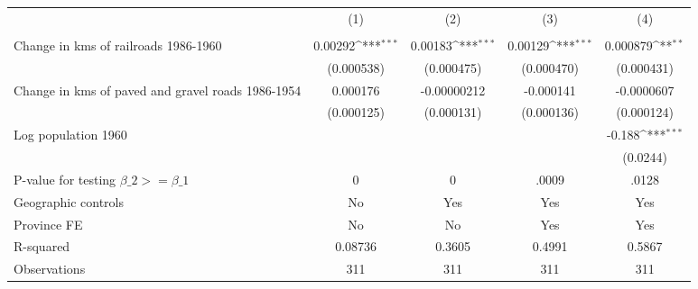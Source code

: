 {
\def\sym#1{\ifmmode^{#1}\else\(^{#1}\)\fi}
\begin{tabular}{l*{4}{c}}
\hline\hline
                &\multicolumn{1}{c}{(1)}&\multicolumn{1}{c}{(2)}&\multicolumn{1}{c}{(3)}&\multicolumn{1}{c}{(4)}\\
                &\multicolumn{1}{c}{}&\multicolumn{1}{c}{}&\multicolumn{1}{c}{}&\multicolumn{1}{c}{}\\
\hline
Change in kms of railroads 1986-1960&  0.00292\sym{***}&  0.00183\sym{***}&  0.00129\sym{***}& 0.000879\sym{**} \\
                &(0.000538)         &(0.000475)         &(0.000470)         &(0.000431)         \\
[1em]
Change in kms of paved and gravel roads 1986-1954& 0.000176         &-0.00000212         &-0.000141         &-0.0000607         \\
                &(0.000125)         &(0.000131)         &(0.000136)         &(0.000124)         \\
[1em]
Log population 1960&                  &                  &                  &   -0.188\sym{***}\\
                &                  &                  &                  & (0.0244)         \\
\hline
P-value for testing $\beta\_{2} >= \beta\_{1}$&        0         &        0         &    .0009         &    .0128         \\
Geographic controls&       No         &      Yes         &      Yes         &      Yes         \\
Province FE     &       No         &       No         &      Yes         &      Yes         \\
R-squared       &  0.08736         &   0.3605         &   0.4991         &   0.5867         \\
Observations    &      311         &      311         &      311         &      311         \\
\hline\hline
\end{tabular}
}
